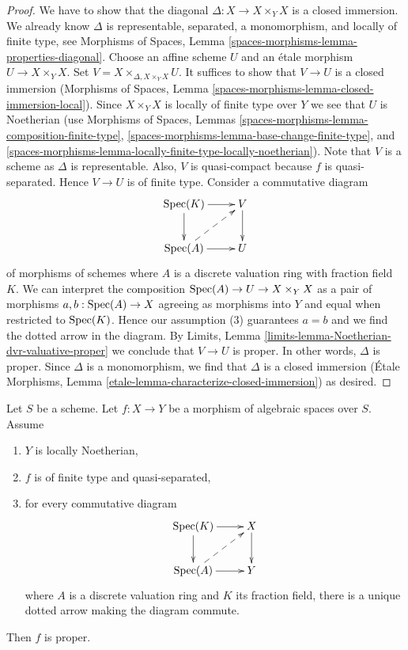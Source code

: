 \begin{proof}
We have to show that the diagonal $\Delta : X \to X \times_Y X$ is a closed
immersion. We already know $\Delta$ is representable, separated,
a monomorphism, and locally of finite type, see Morphisms of Spaces, Lemma
\ref{spaces-morphisms-lemma-properties-diagonal}.
Choose an affine scheme $U$ and an \'etale morphism
$U \to X \times_Y X$. Set $V = X \times_{\Delta, X \times_Y X} U$.
It suffices to show that $V \to U$ is a closed immersion
(Morphisms of Spaces, Lemma
\ref{spaces-morphisms-lemma-closed-immersion-local}).
Since $X \times_Y X$ is locally of finite type over $Y$ we see that
$U$ is Noetherian (use Morphisms of Spaces, Lemmas
\ref{spaces-morphisms-lemma-composition-finite-type},
\ref{spaces-morphisms-lemma-base-change-finite-type}, and
\ref{spaces-morphisms-lemma-locally-finite-type-locally-noetherian}).
Note that $V$ is a scheme as $\Delta$ is representable.
Also, $V$ is quasi-compact because $f$ is quasi-separated.
Hence $V \to U$ is of finite type. Consider a commutative diagram
$$
\xymatrix{
\Spec(K) \ar[r] \ar[d] & V \ar[d] \\
\Spec(A) \ar[r] \ar@{-->}[ru] & U
}
$$
of morphisms of schemes
where $A$ is a discrete valuation ring with fraction field $K$.
We can interpret the composition $\mathop{\mathrm{Spec}}(A) \to U \to X \times_Y X$
as a pair of morphisms $a, b : \mathop{\mathrm{Spec}}(A) \to X$ agreeing as morphisms
into $Y$ and equal when restricted to $\mathop{\mathrm{Spec}}(K)$. Hence our assumption
(3) guarantees $a = b$ and we find the dotted arrow in the diagram.
By Limits, Lemma \ref{limits-lemma-Noetherian-dvr-valuative-proper}
we conclude that $V \to U$ is proper. In other words, $\Delta$ is proper.
Since $\Delta$ is a monomorphism, we find that $\Delta$ is a
closed immersion (\'Etale Morphisms, Lemma
\ref{etale-lemma-characterize-closed-immersion}) as desired.
\end{proof}

\begin{lemma}
\label{lemma-check-proper-dvr}
Let $S$ be a scheme. Let $f : X \to Y$ be a morphism of algebraic
spaces over $S$. Assume
\begin{enumerate}
\item $Y$ is locally Noetherian,
\item $f$ is of finite type and quasi-separated,
\item for every commutative diagram
$$
\xymatrix{
\Spec(K) \ar[r] \ar[d] & X \ar[d] \\
\Spec(A) \ar[r] \ar@{-->}[ru] & Y
}
$$
where $A$ is a discrete valuation ring and $K$ its fraction field,
there is a unique dotted arrow making the diagram commute.
\end{enumerate}
Then $f$ is proper.
\end{lemma}

